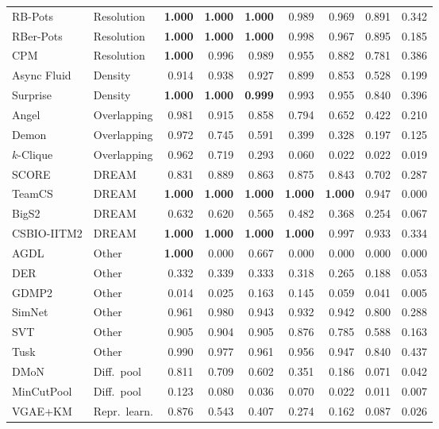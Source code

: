 \begin{table}[t]
\begin{tabular}{llrrrrrrr}
RB-Pots & Resolution & \textbf{1.000} & \textbf{1.000} & \textbf{1.000} & 0.989 & 0.969 & 0.891 & 0.342 \\
RBer-Pots & Resolution & \textbf{1.000} & \textbf{1.000} & \textbf{1.000} & 0.998 & 0.967 & 0.895 & 0.185 \\
CPM & Resolution & \textbf{1.000} & 0.996 & 0.989 & 0.955 & 0.882 & 0.781 & 0.386 \\
Async Fluid & Density & 0.914 & 0.938 & 0.927 & 0.899 & 0.853 & 0.528 & 0.199 \\
Surprise & Density & \textbf{1.000} & \textbf{1.000} & \textbf{0.999} & 0.993 & 0.955 & 0.840 & 0.396 \\
Angel & Overlapping & 0.981 & 0.915 & 0.858 & 0.794 & 0.652 & 0.422 & 0.210 \\
Demon & Overlapping & 0.972 & 0.745 & 0.591 & 0.399 & 0.328 & 0.197 & 0.125 \\
$k$-Clique & Overlapping & 0.962 & 0.719 & 0.293 & 0.060 & 0.022 & 0.022 & 0.019 \\
SCORE & DREAM & 0.831 & 0.889 & 0.863 & 0.875 & 0.843 & 0.702 & 0.287 \\
TeamCS & DREAM & \textbf{1.000} & \textbf{1.000} & \textbf{1.000} & \textbf{1.000} & \textbf{1.000} & 0.947 & 0.000 \\
BigS2 & DREAM & 0.632 & 0.620 & 0.565 & 0.482 & 0.368 & 0.254 & 0.067 \\
CSBIO-IITM2 & DREAM & \textbf{1.000} & \textbf{1.000} & \textbf{1.000} & \textbf{1.000} & 0.997 & 0.933 & 0.334 \\
AGDL & Other & \textbf{1.000} & 0.000 & 0.667 & 0.000 & 0.000 & 0.000 & 0.000 \\
DER & Other & 0.332 & 0.339 & 0.333 & 0.318 & 0.265 & 0.188 & 0.053 \\
GDMP2 & Other & 0.014 & 0.025 & 0.163 & 0.145 & 0.059 & 0.041 & 0.005 \\
SimNet & Other & 0.961 & 0.980 & 0.943 & 0.932 & 0.942 & 0.800 & 0.288 \\
SVT & Other & 0.905 & 0.904 & 0.905 & 0.876 & 0.785 & 0.588 & 0.163 \\
Tusk & Other & 0.990 & 0.977 & 0.961 & 0.956 & 0.947 & 0.840 & 0.437 \\
\midrule
DMoN & Diff.\ pool & 0.811 & 0.709 & 0.602 & 0.351 & 0.186 & 0.071 & 0.042 \\
MinCutPool & Diff.\ pool & 0.123 & 0.080 & 0.036 & 0.070 & 0.022 & 0.011 & 0.007 \\
VGAE+KM & Repr.\ learn. & 0.876 & 0.543 & 0.407 & 0.274 & 0.162 & 0.087 & 0.026 \\

\end{tabular}
\end{table}
